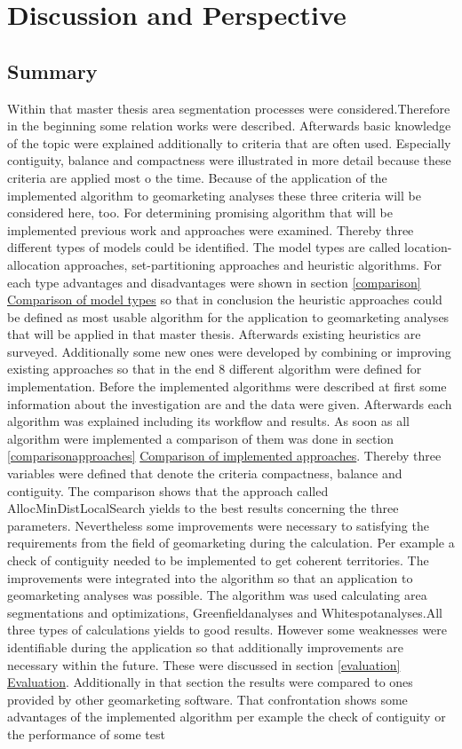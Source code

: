 \section{Discussion and Perspective}
\subsection{Summary}

Within that master thesis area segmentation processes were considered.Therefore in the beginning some relation works were described. Afterwards basic knowledge of the topic were explained additionally to criteria that are often used. Especially contiguity, balance and compactness were illustrated in more detail because these criteria are applied most o the time. Because of the application of the implemented algorithm to geomarketing analyses these three criteria will be considered here, too. For determining promising algorithm that will be implemented previous work and approaches were examined. Thereby three different types of models could be identified. The model types are called location-allocation approaches, set-partitioning approaches and heuristic algorithms. For each type advantages and disadvantages were shown in section \ref{comparison} \hyperref[comparison]{Comparison of model types} so that in conclusion the heuristic approaches could be defined as most usable algorithm for the application to geomarketing analyses that will be applied in that master thesis. Afterwards existing heuristics are surveyed. Additionally some new ones were developed by combining or improving existing approaches so that in the end 8 different algorithm were defined for implementation. Before the implemented algorithms were described at first some information about the investigation are and the data were given. Afterwards each algorithm was explained including its workflow and results. As soon as all algorithm were implemented a comparison of them was done in section \ref{comparisonapproaches} \hyperref[comparisonapproaches]{Comparison of implemented approaches}. Thereby three variables were defined that denote the criteria compactness, balance and contiguity. The comparison shows that the approach called AllocMinDistLocalSearch yields to the best results concerning the three parameters. Nevertheless some improvements were necessary to satisfying the requirements from the field of geomarketing during the calculation. Per example a check of contiguity needed to be implemented to get coherent territories. The improvements were integrated into the algorithm so that an application to geomarketing analyses was possible. The algorithm was used calculating area segmentations and optimizations, Greenfieldanalyses and Whitespotanalyses.All three types of calculations yields to good results. However some weaknesses were identifiable during the application so that additionally improvements are necessary within the future. These were discussed in section \ref{evaluation} \hyperref[evaluation]{Evaluation}. Additionally in that section the results were compared to ones provided by other geomarketing software. That confrontation shows some advantages of the implemented algorithm per example the check of contiguity or the performance of some test 